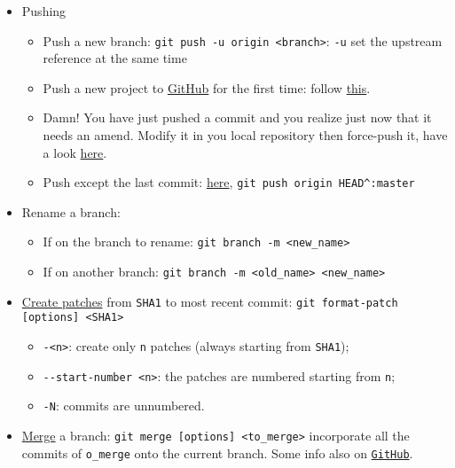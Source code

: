 \documentclass[a4paper,12pt,%
              final%
              ]{article}
\begin{document}
\begin{itemize}
\begin{itemize}
    \end{itemize}
  \item Pushing
    \begin{itemize}
      \item Push a new branch: \verb|git push -u origin <branch>|: \verb|-u| set the upstream reference at the same time
      \item Push a new project to \href{https://github.com/}{GitHub} for the first time: follow \href{https://help.github.com/en/github/importing-your-projects-to-github/adding-an-existing-project-to-github-using-the-command-line}{this}.
      \item Damn! You have just pushed a commit and you realize just now that it needs an amend. Modify it in you local repository then force-push it, have a look \href{https://stackoverflow.com/questions/179123/how-to-modify-existing-unpushed-commit-messages}{here}.
      \item Push except the last commit: \href{https://stackoverflow.com/questions/8879375/git-push-push-all-commits-except-the-last-one}{here}, \verb|git push origin HEAD^:master|
    \end{itemize}
  \item Rename a branch:
    \begin{itemize}
      \item If on the branch to rename: \verb|git branch -m <new_name>|
      \item If on another branch: \verb|git branch -m <old_name> <new_name>|
    \end{itemize}
  \item \href{https://git-scm.com/docs/git-format-patch}{Create patches} from \texttt{SHA1} to most recent commit: \verb|git format-patch [options] <SHA1>|
    \begin{itemize}
      \item \texttt{-<n>}: create only \texttt{n} patches (always starting from \texttt{SHA1});
      \item \verb|--start-number <n>|: the patches are numbered starting from \texttt{n};
      \item \texttt{-N}: commits are unnumbered.
    \end{itemize}
  \item \href{https://git-scm.com/docs/git-merge}{Merge} a branch: \verb|git merge [options] <to_merge>| incorporate all the commits of \verb|o_merge| onto the current branch. Some info also on \href{https://docs.github.com/en/github/collaborating-with-issues-and-pull-requests/about-pull-request-merges}{\texttt{GitHub}}.

\end{itemize}
\end{document}
